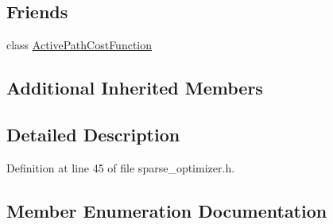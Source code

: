 \subsection*{Friends}
\begin{DoxyCompactItemize}
\item 
class \hyperlink{classg2o_1_1SparseOptimizer_af974cb94744550cc732d61f7fd7d63ed}{Active\+Path\+Cost\+Function}
\end{DoxyCompactItemize}
\subsection*{Additional Inherited Members}


\subsection{Detailed Description}


Definition at line 45 of file sparse\+\_\+optimizer.\+h.



\subsection{Member Enumeration Documentation}
